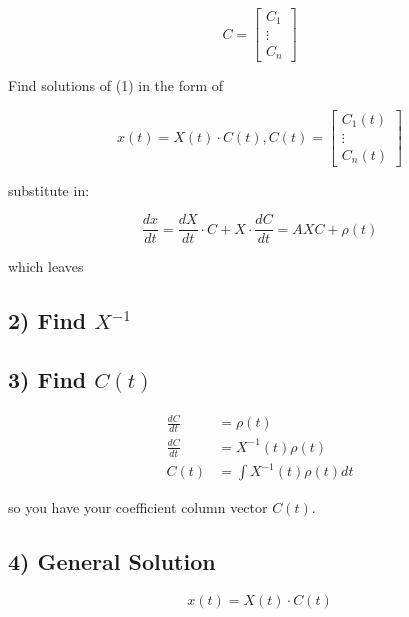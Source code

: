 \documentclass[twocolumn,draft]{article}
\begin{document}
  \begin{equation*}
  	C = \begin{bmatrix}
			C_{1} \\
			\vdots \\
			C_{n}
  		\end{bmatrix}
  \end{equation*}
  
  Find solutions of (1) in the form of
  
  \begin{equation*}
  	x(t) = X(t)\cdot C(t), C(t) = \begin{bmatrix}
  									C_{1}(t) \\
									\vdots \\
									C_{n}(t)
  								  \end{bmatrix}
  \end{equation*}
  
  substitute in:
  
  \begin{equation*}
  	\frac{dx}{dt} = \boxed{\frac{dX}{dt} \cdot C} + X\cdot \frac{dC}{dt} = \boxed{AXC} + \rho(t)
  \end{equation*}
  
  which leaves
  
 \subsection*{2) Find $X^{-1}$}
 
 \subsection*{3) Find $C(t)$}
  \begin{align*}
  	\frac{dC}{dt} &= \rho(t) \\
	\frac{dC}{dt} &= X^{-1}(t)\rho(t) \\
	C(t) &= \int X^{-1}(t)\rho(t)dt
  \end{align*}
  
  so you have your coefficient column vector $C(t)$.
  
  \subsection*{4) General Solution}
  
  \begin{equation}
  	x(t) = X(t) \cdot C(t)
  \end{equation}
  
  \newpage
  
\end{document}
